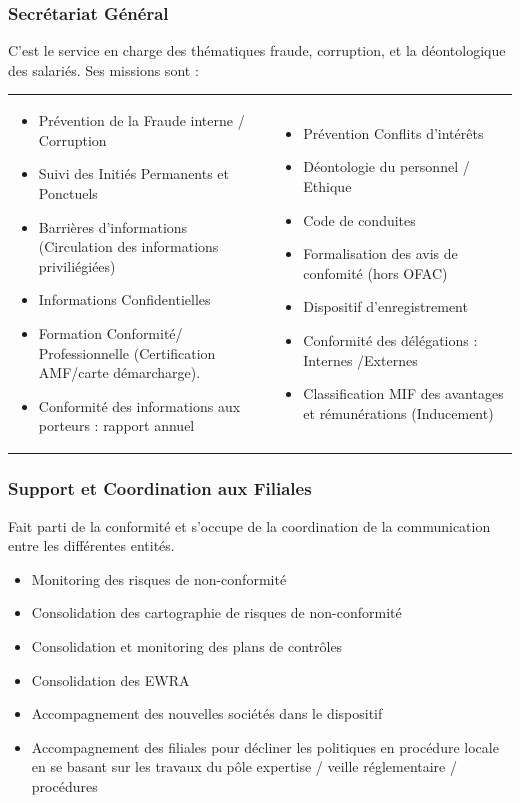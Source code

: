 \documentclass[12pt,a4paper]{report}
\begin{document}
\subsubsection{Secrétariat Général}
C'est le service en charge des thématiques fraude, corruption, et la déontologique des salariés. Ses missions sont :\newline
\begin{tabular}{p{}p{}}
\flushleft 
\begin{itemize}
\item Prévention de la Fraude interne / Corruption
\item Suivi des Initiés Permanents et Ponctuels
\item Barrières d’informations (Circulation des informations priviliégiées)
\item Informations Confidentielles
\item Formation Conformité/ Professionnelle (Certification AMF/carte démarcharge).
\item Conformité des informations aux porteurs : rapport annuel
\end{itemize}
& \flushright
\begin{itemize}
\item Prévention Conflits d’intérêts
\item Déontologie du personnel / Ethique
\item Code de conduites
\item Formalisation des avis de confomité (hors OFAC)
\item Dispositif d’enregistrement
\item Conformité des délégations : Internes /Externes
\item Classification MIF des avantages et rémunérations (Inducement)
\end{itemize}
\end{tabular}

\subsubsection{Support et Coordination aux Filiales}
Fait parti de la conformité et s'occupe de la coordination de la communication entre les différentes entités.
\begin{itemize}
\item Monitoring des risques de non-conformité
\item Consolidation des cartographie de risques de non-conformité
\item Consolidation et monitoring des plans de contrôles
\item Consolidation des EWRA
\item Accompagnement des nouvelles sociétés dans le dispositif
\item Accompagnement des filiales pour décliner les politiques en procédure locale en se basant sur les travaux du pôle expertise / veille réglementaire / procédures
\end{itemize}
\end{document}
